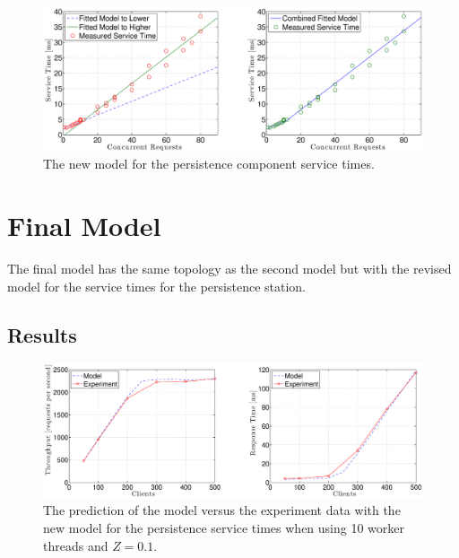 \documentclass[a4paper, 11pt]{article}
\begin{document}
	\FloatBarrier
	\begin{figure}[cht!]
		\centering
			\includegraphics[width=1\linewidth,keepaspectratio]{newServiceTimeDb}
		\caption{The new model for the persistence component service times.}
		\label{fig:newServiceTimeDb}
	\end{figure}
	\FloatBarrier

\section{Final Model}
The final model has the same topology as the second model but with the revised model for the service times for the persistence station.

	\subsection{Results}
	 
	\FloatBarrier

	\begin{figure}[cht!]
		\centering
			\includegraphics[width=1\linewidth,keepaspectratio]{thirdRealAndModel10Th}
		\caption{The prediction of the model versus the experiment data with the new model for the persistence service times when using 10 worker threads and $Z = 0.1$.}
		\label{fig:thirdRealAndModel10Th}
	\end{figure}
\end{document}
